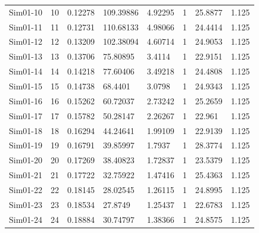 \documentclass [10pt] {article}
\begin{document}
\begin{table}[H]
\begin{tabular}{c|cllllll}
		Sim01-10 & 10         & 0.12278                         & 109.39886     & 4.92295   & 1              & 25.8877       & 1.125     \\
		Sim01-11 & 11         & 0.12731                         & 110.68133     & 4.98066   & 1              & 24.4414       & 1.125     \\
		Sim01-12 & 12         & 0.13209                         & 102.38094     & 4.60714   & 1              & 24.9053       & 1.125     \\
		Sim01-13 & 13         & 0.13706                         & 75.80895      & 3.4114    & 1              & 22.9151       & 1.125     \\
		Sim01-14 & 14         & 0.14218                         & 77.60406      & 3.49218   & 1              & 24.4808       & 1.125     \\
		Sim01-15 & 15         & 0.14738                         & 68.4401       & 3.0798    & 1              & 24.9343       & 1.125     \\
		Sim01-16 & 16         & 0.15262                         & 60.72037      & 2.73242   & 1              & 25.2659       & 1.125     \\
		Sim01-17 & 17         & 0.15782                         & 50.28147      & 2.26267   & 1              & 22.961        & 1.125     \\
		Sim01-18 & 18         & 0.16294                         & 44.24641      & 1.99109   & 1              & 22.9139       & 1.125     \\
		Sim01-19 & 19         & 0.16791                         & 39.85997      & 1.7937    & 1              & 28.3774       & 1.125     \\
		Sim01-20 & 20         & 0.17269                         & 38.40823      & 1.72837   & 1              & 23.5379       & 1.125     \\
		Sim01-21 & 21         & 0.17722                         & 32.75922      & 1.47416   & 1              & 25.4363       & 1.125     \\
		Sim01-22 & 22         & 0.18145                         & 28.02545      & 1.26115   & 1              & 24.8995       & 1.125     \\
		Sim01-23 & 23         & 0.18534                         & 27.8749       & 1.25437   & 1              & 22.6783       & 1.125     \\
		Sim01-24 & 24         & 0.18884                         & 30.74797      & 1.38366   & 1              & 24.8575       & 1.125     \\

\end{tabular}
\end{table}
\end{document}
